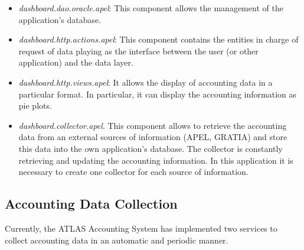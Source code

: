 \begin{itemize}
\item
{\itshape dashboard.dao.oracle.apel}: This component allows the
management of the application's database.
\item
{\itshape dashboard.http.actions.apel}: This component contains the
entities in charge of request of data playing as the
interface between the user (or other application)
and the data layer.
\item
{\itshape dashboard.http.views.apel}: It allows
the display of accounting data
in a particular format.
In particular, it can display the accounting information as pie
plots.
\item
{\itshape dashboard.collector.apel}.
This component allows to retrieve the accounting data from an external
sources of information (APEL, GRATIA) and store this data into the
own application's database.
The collector is constantly retrieving and updating the accounting
information.
In this application it is necessary to create one collector
for each source of information.
\end{itemize}

\subsection{Accounting Data Collection}
Currently, the ATLAS Accounting System has implemented two services to
collect accounting data in an automatic and periodic manner.

